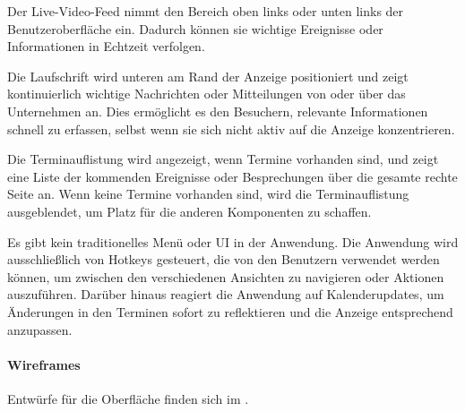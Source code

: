 Der Live-Video-Feed nimmt den Bereich oben links oder unten links der Benutzeroberfläche ein.
Dadurch können sie wichtige Ereignisse oder Informationen in Echtzeit verfolgen.

Die Laufschrift wird unteren am Rand der Anzeige positioniert und zeigt kontinuierlich wichtige Nachrichten oder Mitteilungen von oder über das Unternehmen an.
Dies ermöglicht es den Besuchern, relevante Informationen schnell zu erfassen, selbst wenn sie sich nicht aktiv auf die Anzeige konzentrieren.

Die Terminauflistung wird angezeigt, wenn Termine vorhanden sind, und zeigt eine Liste der kommenden Ereignisse oder Besprechungen über die gesamte rechte Seite an.
Wenn keine Termine vorhanden sind, wird die Terminauflistung ausgeblendet, um Platz für die anderen Komponenten zu schaffen.

Es gibt kein traditionelles Menü oder \ac{UI} in der Anwendung.
Die Anwendung wird ausschließlich von Hotkeys gesteuert, die von den Benutzern verwendet werden können, um zwischen den verschiedenen Ansichten zu navigieren oder Aktionen auszuführen.
Darüber hinaus reagiert die Anwendung auf Kalenderupdates, um Änderungen in den Terminen sofort zu reflektieren und die Anzeige entsprechend anzupassen.

\paragraph{Wireframes}
Entwürfe für die Oberfläche finden sich im .


%
%
%


